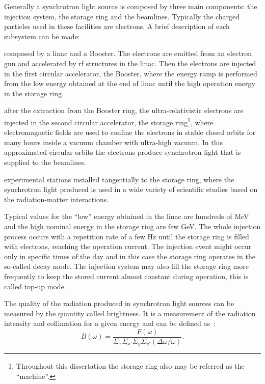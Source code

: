 Generally a synchrotron light source is composed by three main components: the injection system, the storage ring and the beamlines. Typically the charged particles used in these facilities are electrons. A brief description of each subsystem can be made:
\begin{description}[align=left]
    \item[Injection system:] composed by a \gls{linac} and a Booster. The electrons are emitted from an electron gun and accelerated by \gls{rf} structures in the \gls{linac}. Then the electrons are injected in the first circular accelerator, the Booster, where the energy ramp is performed from the low energy obtained at the end of \gls{linac} until the high operation energy in the storage ring.
    \item[Storage ring:] after the extraction from the Booster ring, the ultra-relativistic electrons are injected in the second circular accelerator, the storage ring\footnote{Throughout this dissertation the storage ring also may be referred as the ``machine''.}, where electromagnetic fields are used to confine the electrons in stable closed orbits for many hours inside a vacuum chamber with ultra-high vacuum. In this approximated circular orbits the electrons produce synchrotron light that is supplied to the beamlines.
    \item[Beamlines:] experimental stations installed tangentially to the storage ring, where the synchrotron light produced is used in a wide variety of scientific studies based on the radiation-matter interactions.
\end{description}

Typical values for the ``low'' energy obtained in the \gls{linac} are hundreds of \si{\mega\electronvolt} and the high nominal energy in the storage ring are few \si{\giga\electronvolt}. The whole injection process occurs with a repetition rate of a few \si{\hertz} until the storage ring is filled with electrons, reaching the operation current. The injection event might occur only in specific times of the day and in this case the storage ring operates in the so-called decay mode. The injection system may also fill the storage ring more frequently to keep the stored current almost constant during operation, this is called top-up mode.

The quality of the radiation produced in synchrotron light sources can be measured by the quantity called brightness. It is a measurement of the radiation intensity and collimation for a given energy and can be defined as~\cite{huang2013}:
\begin{equation}
    B(\omega) = \dfrac{F(\omega)}{\Sigma_x \Sigma_{x'} \Sigma_y \Sigma_{y'} \left(\Delta \omega /\omega\right)}.
\end{equation}

